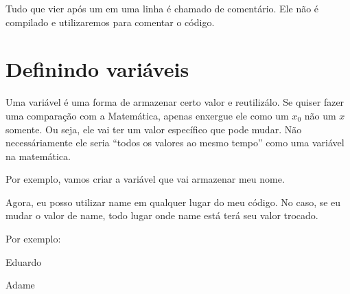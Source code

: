 \documentclass[letterpaper,10pt,english]{jupyterBook}
\begin{document}
\sphinxAtStartPar
Tudo que vier após um \sphinxcode{\sphinxupquote{\#}} em uma linha é chamado de comentário. Ele não é compilado e utilizaremos para comentar o código.


\section{Definindo variáveis}
\label{\detokenize{chapters/2:definindo-variaveis}}
\sphinxAtStartPar
Uma variável é uma forma de armazenar certo valor e reutilizá\sphinxhyphen{}lo. Se quiser fazer uma comparação com a Matemática, apenas enxergue ele como um \(x_0\) não um \(x\) somente. Ou seja, ele vai ter um valor específico que pode mudar. Não necessáriamente ele seria “todos os valores ao mesmo tempo” como uma variável na matemática.

\sphinxAtStartPar
Por exemplo, vamos criar a variável  que vai armazenar meu nome.

\begin{sphinxVerbatim}[commandchars=\\\{\}]
  
\end{sphinxVerbatim}

\sphinxAtStartPar
Agora, eu posso utilizar name em qualquer lugar do meu código. No caso, se eu mudar o valor de name, todo lugar onde name está terá seu valor trocado.

\sphinxAtStartPar
Por exemplo:

\begin{sphinxVerbatim}[commandchars=\\\{\}]
  
\end{sphinxVerbatim}

\begin{sphinxVerbatim}[commandchars=\\\{\}]
\PYGZsq{}Eduardo\PYGZsq{}
\end{sphinxVerbatim}

\begin{sphinxVerbatim}[commandchars=\\\{\}]
  
\end{sphinxVerbatim}

\begin{sphinxVerbatim}[commandchars=\\\{\}]
\PYGZsq{}Adame\PYGZsq{}
\end{sphinxVerbatim}
\end{document}
